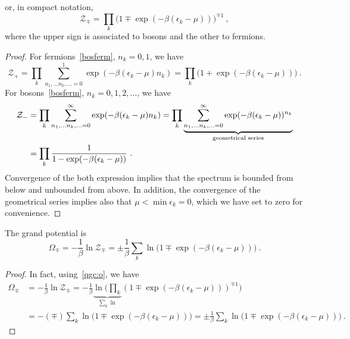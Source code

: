     or, in compact notation, 
    \begin{equation*}
        \mathcal Z_\mp = \prod_k \Big ( 1 \mp \exp(- \beta (\epsilon_k - \mu) ) \Big)^{\mp 1} ~,
    \end{equation*}
    where the upper sign is associated to bosons and the other to fermions.
    \begin{proof}
        For fermions~\eqref{bosferm}, $n_k = 0, 1$, we have
        \begin{equation*}
            \mathcal Z_+ = \prod_k \sum_{n_1, \ldots n_k, \ldots = 0}^1 \exp(-\beta(\epsilon_k - \mu)n_k) = \prod_k \Big (1 + \exp (- \beta (\epsilon_k - \mu)) \Big ) ~.
        \end{equation*}
        For bosons~\eqref{bosferm}, $n_k = 0, 1, 2, \ldots$, we have
        \begin{equation*}
        \begin{aligned}
            \mathcal Z_- & = \prod_k \sum_{n_1, \ldots n_k, \ldots = 0}^\infty \exp(-\beta(\epsilon_k - \mu)n_k) = \prod_k \underbrace{\sum_{n_1, \ldots n_k, \ldots = 0}^\infty \exp(-\beta(\epsilon_k - \mu))^{n_k}}_{\textnormal{geometrical series}} \\ & = \prod_k \frac{1}{1 - \exp (- \beta (\epsilon_k - \mu))} ~.
        \end{aligned}
        \end{equation*}
        Convergence of the both expression implies that the spectrum is bounded from below and unbounded from above. In addition, the convergence of the geometrical series implies also that $\mu < \min \epsilon_k = 0$, which we have set to zero for convenience.
    \end{proof}
    The grand potential is 
    \begin{equation}\label{o1}
        \Omega_\mp = -\frac{1}{\beta} \ln \mathcal Z_\mp = \pm \frac{1}{\beta} \sum_k \ln \Big (1 \mp \exp (-\beta (\epsilon_k - \mu)) \Big) ~.
    \end{equation}
    \begin{proof}
        In fact, using~\eqref{qgc:o}, we have
        \begin{equation*}
        \begin{aligned}
            \Omega_\mp & = -\frac{1}{\beta} \ln \mathcal Z_\mp= - \frac{1}{\beta} \underbrace{\ln \Big (\prod_k}_{\sum_k \ln} ( 1 \mp \exp(- \beta (\epsilon_k - \mu) ))^{\mp 1} \Big ) \\ & = - (\mp) \sum_k \ln \Big (1 \mp \exp (-\beta (\epsilon_k - \mu))) = \pm \frac{1}{\beta} \sum_k \ln \Big (1 \mp \exp (-\beta (\epsilon_k - \mu)) \Big) ~.
        \end{aligned}
        \end{equation*}
    \end{proof}


